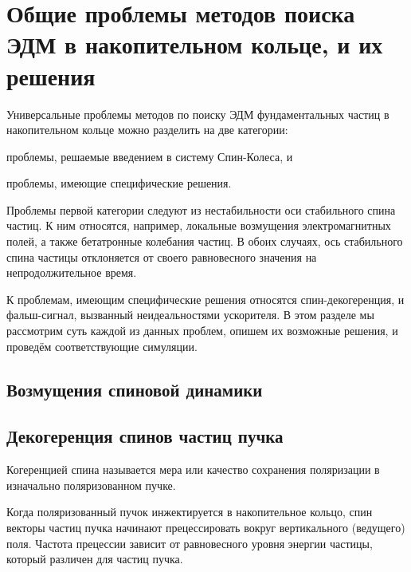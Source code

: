 

\chapter{Общие проблемы методов поиска ЭДМ в накопительном кольце, и их решения} \label{chpt:simulation}
 
Универсальные проблемы методов по поиску ЭДМ фундаментальных частиц в накопительном кольце можно разделить на 
две категории:
\begin{enumerate*}
	\item проблемы, решаемые введением в систему Спин-Колеса, и
	\item проблемы, имеющие специфические решения.
\end{enumerate*}

Проблемы первой категории следуют из нестабильности оси стабильного спина частиц. К ним относятся, например, 
локальные возмущения электромагнитных полей, а также бетатронные колебания частиц. В обоих случаях, ось стабильного спина частицы отклоняется от своего равновесного значения на непродолжительное время.

К проблемам, имеющим специфические решения относятся спин-декогеренция, и фальш-сигнал, вызванный 
неидеальностями ускорителя. В этом разделе мы рассмотрим суть каждой из данных проблем, опишем их возможные
решения, и проведём соответствующие симуляции.
  
\section{Возмущения спиновой динамики}


\section{Декогеренция спинов частиц пучка}
Когеренцией спина называется мера или качество сохранения поляризации
в изначально поляризованном пучке.~\cite[стр.~205]{Eremey:Thesis}

Когда поляризованный пучок инжектируется в накопительное кольцо, спин
векторы частиц пучка начинают прецессировать вокруг вертикального
(ведущего) поля. Частота прецессии зависит от равновесного уровня
энергии частицы, который различен для частиц пучка.

